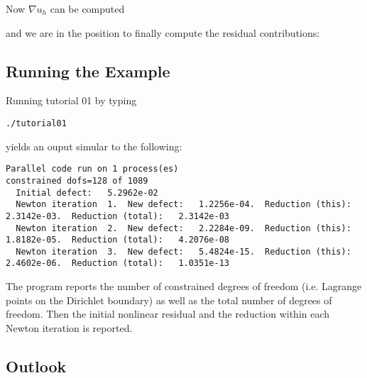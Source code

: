 \documentclass[a4paper,12pt]{article}
\begin{document}
Now $\nabla u_h$ can be computed

and we are in the position to finally compute the residual contributions:


\subsection{Running the Example}

Running tutorial 01 by typing
\begin{lstlisting}[basicstyle=\ttfamily\small,
frame=single,
backgroundcolor=\color{listingbg}]
./tutorial01
\end{lstlisting}
yields an ouput simular to the following:
\begin{lstlisting}[basicstyle=\ttfamily\tiny,
frame=single,
backgroundcolor=\color{listingbg}]
Parallel code run on 1 process(es)
constrained dofs=128 of 1089
  Initial defect:   5.2962e-02
  Newton iteration  1.  New defect:   1.2256e-04.  Reduction (this):   2.3142e-03.  Reduction (total):   2.3142e-03
  Newton iteration  2.  New defect:   2.2284e-09.  Reduction (this):   1.8182e-05.  Reduction (total):   4.2076e-08
  Newton iteration  3.  New defect:   5.4824e-15.  Reduction (this):   2.4602e-06.  Reduction (total):   1.0351e-13
\end{lstlisting}
The program reports the number of constrained degrees of freedom
(i.e. Lagrange points on the Dirichlet boundary) as well as the total number of degrees of freedom.
Then the initial nonlinear residual and the reduction within each Newton iteration is reported.

\subsection{Outlook}
\end{document}
